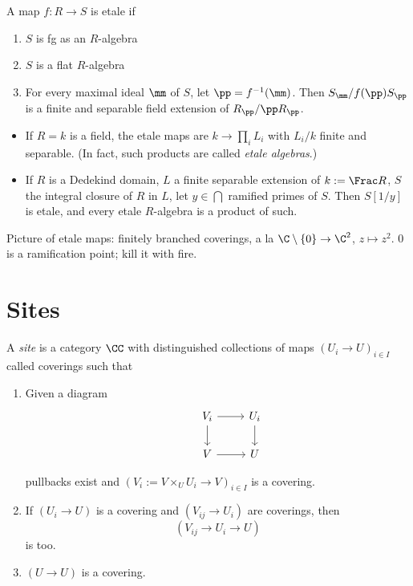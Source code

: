 \documentclass{scrreprt}
\begin{document}
\begin{defn}
  A map $f:R\to S$ is etale if
  \begin{enumerate}
  \item $S$ is fg as an $R$-algebra
  \item $S$ is a flat $R$-algebra
  \item For every maximal ideal $\mm$ of $S$, let $\pp=f^{-1}(\mm)$.
    Then $S_\mm/f(\pp)S_\pp$ is a finite and separable field extension of $R_\pp/\pp R_\pp$.
  \end{enumerate}
\end{defn}

\begin{itemize}
\item If $R=k$ is a field, the etale maps are $k\to \prod_i L_i$ with $L_i/k$
  finite and separable. (In fact, such products are called \textit{etale
    algebras}.)
\item If $R$ is a Dedekind domain, $L$ a finite separable extension of $k:=
  \Frac R$, $S$ the integral closure of $R$ in $L$, let $y\in\bigcap$ ramified
  primes of $S$. Then $S[1/y]$ is etale, and every etale $R$-algebra is a
  product of such.
\end{itemize}

Picture of etale maps: finitely branched coverings, a la $\C\setminus\{0\}\to\C^2$,
$z\mapsto z^2$. $0$ is a ramification point; kill it with fire.

\section{Sites}
\begin{defn}
 A \textit{site} is a category $\CC$ with distinguished collections of maps
 $(U_i\to U)_{i\in I}$ called coverings such that

 \begin{enumerate}
 \item Given a diagram $$
   \begin{tikzcd}
     &V_i\ar[r]\ar[d]&U_i\ar[d]\\
     &V\ar[r]&U
   \end{tikzcd}
   $$

   pullbacks exist and $(V_i:= V\times_U U_i \to V)_{i\in I}$ is a covering.
 \item If $(U_i\to U)$ is a covering and $(V_{ij}\to U_i)$ are coverings,
   then $$(V_{ij} \to U_i\to U)$$ is too.
 \item $(U\to U)$ is a covering.
 \end{enumerate}
\end{defn}
\end{document}
